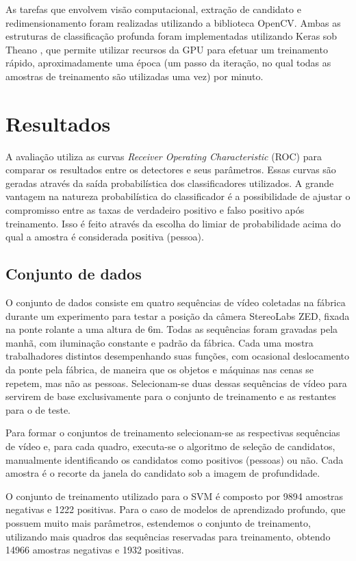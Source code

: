         As tarefas que envolvem visão computacional, extração de candidato e redimensionamento foram realizadas utilizando a biblioteca OpenCV. Ambas as estruturas de classificação profunda foram implementadas utilizando Keras \cite{keras} sob Theano \cite{theano}, que permite utilizar recursos da GPU para efetuar um treinamento rápido, aproximadamente uma época (um passo da iteração, no qual todas as amostras de treinamento são utilizadas uma vez) por minuto.

\section{Resultados}
\label{sec:results}

    A avaliação utiliza as curvas \textit{Receiver Operating Characteristic} (ROC) \cite{evaluationMetrics} para comparar os resultados entre os detectores e seus parâmetros. Essas curvas são geradas através da saída probabilística dos classificadores utilizados. A grande vantagem na natureza probabilística do classificador é a possibilidade de ajustar o compromisso entre as taxas de verdadeiro positivo e falso positivo após treinamento. Isso é feito através da escolha do limiar de probabilidade acima do qual a amostra é considerada positiva (pessoa).

\subsection{Conjunto de dados}
    O conjunto de dados consiste em quatro sequências de vídeo coletadas na fábrica durante um experimento para testar a posição da câmera StereoLabs ZED, fixada na ponte rolante a uma altura de 6m. Todas as sequências foram gravadas pela manhã, com iluminação constante e padrão da fábrica. Cada uma mostra trabalhadores distintos desempenhando suas funções, com ocasional deslocamento da ponte pela fábrica, de maneira que os objetos e máquinas nas cenas se repetem, mas não as pessoas. Selecionam-se duas dessas sequências de vídeo para servirem de base exclusivamente para o conjunto de treinamento e as restantes para o de teste.

    Para formar o conjuntos de treinamento selecionam-se as respectivas sequências de vídeo e, para cada quadro, executa-se o algoritmo de seleção de candidatos, manualmente identificando os candidatos como positivos (pessoas) ou não.  Cada amostra é o recorte da janela do candidato sob a imagem de profundidade.

    O conjunto de treinamento utilizado para o SVM é composto por 9894 amostras negativas e 1222 positivas. Para o caso de modelos de aprendizado profundo, que possuem muito mais parâmetros, estendemos o conjunto de treinamento, utilizando mais quadros das sequências reservadas para treinamento, obtendo 14966 amostras negativas e 1932 positivas.

